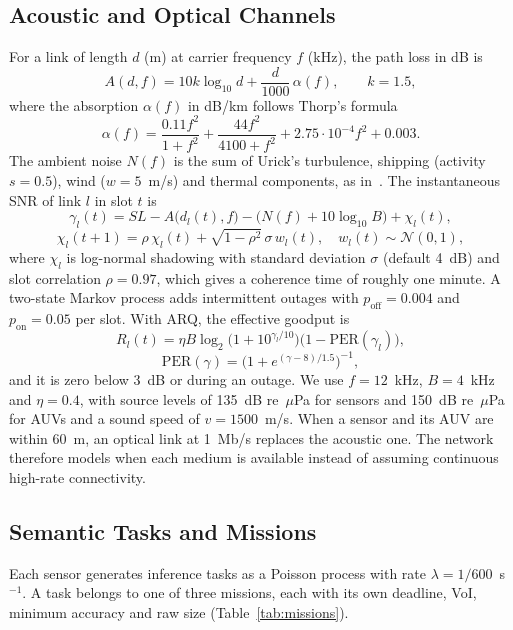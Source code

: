 \documentclass[lettersize,journal]{IEEEtran}
\begin{document}
\subsection{Acoustic and Optical Channels}
For a link of length $d$ (m) at carrier frequency $f$ (kHz), the path loss in dB is
\begin{equation}
A(d,f) = 10k\log_{10} d + \frac{d}{1000}\,\alpha(f),\qquad k = 1.5,
\end{equation}
where the absorption $\alpha(f)$ in dB/km follows Thorp's formula~\cite{stojanovic2007capacity}
\begin{equation}
\alpha(f) = \frac{0.11 f^2}{1+f^2} + \frac{44 f^2}{4100+f^2} + 2.75\cdot 10^{-4} f^2 + 0.003 .
\end{equation}
The ambient noise $N(f)$ is the sum of Urick's turbulence, shipping (activity $s=0.5$), wind ($w=5$~m/s) and thermal components, as in~\cite{shu2026offload}. The instantaneous SNR of link $l$ in slot $t$ is
\begin{equation}
\gamma_l(t) = SL - A\big(d_l(t),f\big) - \big(N(f) + 10\log_{10} B\big) + \chi_l(t),
\end{equation}
\begin{equation}
\chi_l(t+1) = \rho\,\chi_l(t) + \sqrt{1-\rho^2}\,\sigma\, w_l(t),\quad w_l(t) \sim \mathcal{N}(0,1),
\end{equation}
where $\chi_l$ is log-normal shadowing with standard deviation $\sigma$ (default 4~dB) and slot correlation $\rho=0.97$, which gives a coherence time of roughly one minute. A two-state Markov process adds intermittent outages with $p_{\mathrm{off}}=0.004$ and $p_{\mathrm{on}}=0.05$ per slot. With ARQ, the effective goodput is
\begin{equation}
R_l(t) = \eta B \log_2\!\big(1+10^{\gamma_l/10}\big)\big(1-\mathrm{PER}(\gamma_l)\big),
\end{equation}
\begin{equation}
\mathrm{PER}(\gamma) = \big(1+e^{(\gamma-8)/1.5}\big)^{-1},
\end{equation}
and it is zero below 3~dB or during an outage. We use $f=12$~kHz, $B=4$~kHz and $\eta=0.4$, with source levels of 135~dB re~$\mu$Pa for sensors and 150~dB re~$\mu$Pa for AUVs and a sound speed of $v=1500$~m/s. When a sensor and its AUV are within 60~m, an optical link at 1~Mb/s replaces the acoustic one. The network therefore models when each medium is available instead of assuming continuous high-rate connectivity.

\subsection{Semantic Tasks and Missions}
Each sensor generates inference tasks as a Poisson process with rate $\lambda=1/600$~s$^{-1}$. A task belongs to one of three missions, each with its own deadline, VoI, minimum accuracy and raw size (Table~\ref{tab:missions}).
\end{document}
